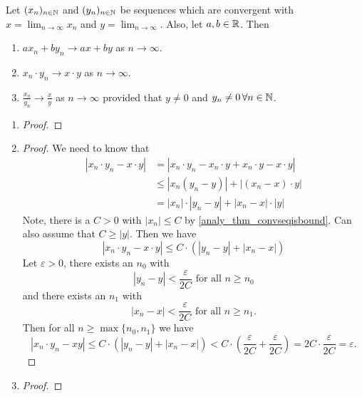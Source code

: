 \documentclass[10pt, a4paper]{article}
\newcommand{\seq}[1][x]{(#1_n)_{n \in \N}}
\begin{document}
\begin{theorem}\label{analy_thm_COLT}
    Let $\seq$ and $\seq[y]$ be sequences which are convergent with $x = \lim_{n \rightarrow \infty}x_n$ and $y = \lim_{n \rightarrow \infty}$.
    Also, let $a, b \in \mathbb{R}$.
    Then
    \begin{enumerate}[label = (\alph*)]
        \item $ax_n + by_n \rightarrow ax + by$ as $n \rightarrow \infty$.
        \item $x_n \cdot y_n \rightarrow x \cdot y$ as $n \rightarrow \infty$.
        \item $\frac{x_n}{y_n} \rightarrow \frac{x}{y}$ as $n \rightarrow \infty$ provided that $y \neq 0$ and $y_n \neq 0\,\forall n \in \mathbb{N}$.
    \end{enumerate}
    \begin{enumerate}[label = (\alph*)]
        \item
        \begin{proof}
        \end{proof}
        \item 
        \begin{proof}
        We need to know that
        \begin{align*}
        |x_n \cdot y_n - x \cdot y| &= |x_n \cdot y_n - x_n \cdot y + x_n \cdot y - x \cdot y| \\
        &\leq |x_n (y_n - y)| + |(x_n - x)\cdot y| \\
        &= |x_n| \cdot |y_n - y| + |x_n - x| \cdot |y|
        \end{align*}
        Note,
        there is a $C > 0$ with $|x_n| \leq C$ by \autoref{analy_thm_convseqisbound}.
        Can also assume that $C \geq |y|$.
        Then we have
        \[
        |x_n \cdot y_n - x \cdot y| \leq C \cdot (|y_n - y| + |x_n - x|)
        \]
        Let $\varepsilon > 0$,
        there exists an $n_0$ with
        \[
        |y_n - y| < \frac{\varepsilon}{2C}\text{ for all } n \geq n_0
        \]
        and there exists an $n_1$ with
        \[
        |x_n - x| < \frac{\varepsilon}{2C}\text{ for all } n \geq n_1.
        \]
        Then for all $n \geq \max\{n_0, n_1\}$ we have
        \[
        |x_n \cdot y_n - xy| \leq C \cdot (|y_n - y| + |x_n - x|) < C \cdot (\frac{\varepsilon}{2C} + \frac{\varepsilon}{2C}) = 2C \cdot \frac{\varepsilon}{2C} = \varepsilon.
        \]
        \end{proof}
        \item
        \begin{proof}
        \end{proof}
    \end{enumerate}
\end{theorem}
\end{document}
